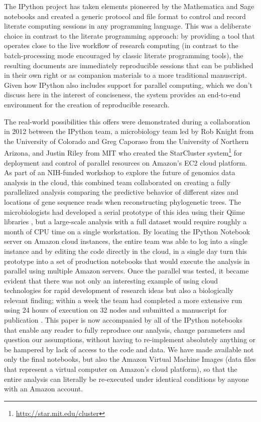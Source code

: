 \documentclass[ChapterTOCs,krantz2]{krantz} %
\begin{document}
The IPython project has taken elements pioneered by the Mathematica and Sage
notebooks and created a generic protocol and file format to control and record
literate computing sessions in any programming language.  This was a deliberate
choice in contrast to the literate programming approach: by providing a tool
that operates close to the live workflow of research computing (in contrast to
the batch-processing mode encouraged by classic literate programming tools),
the resulting documents are immediately reproducible sessions that can be
published in their own right or as companion materials to a more traditional
manuscript.  Given how IPython also includes support for parallel computing,
which we don't discuss here in the interest of conciseness, the system provides
an end-to-end environment for the creation of reproducible research.

The real-world possibilities this offers were demonstrated during a
collaboration in 2012 between the IPython team, a microbiology team led by Rob
Knight from the University of Colorado and Greg Caporaso from the University of
Northern Arizona, and Justin Riley from MIT who created the StarCluster system\footnote{\url{http://star.mit.edu/cluster}}
for deployment and control of
parallel resources on Amazon's EC2 cloud platform.  As part of an NIH-funded
workshop to explore the future of genomics data analysis in the cloud, this
combined team collaborated on creating a fully parallelized analysis comparing
the predictive behavior of different sizes and locations of gene sequence reads
when reconstructing phylogenetic trees.  The microbiologists had developed a
serial prototype of this idea using their Qiime libraries
\cite{caporaso2010qiime}, but a large-scale analysis with a full dataset would
require roughly a month of CPU time on a single workstation.  By locating the
IPython Notebook server on Amazon cloud instances, the entire team was able to
log into a single instance and by editing the code directly in the cloud, in a
single day turn this prototype into a set of production notebooks that would
execute the analysis in parallel using multiple Amazon servers.  Once the
parallel was tested, it became evident that there was not only an interesting
example of using cloud technologies for rapid development of research ideas but
also a biologically relevant finding; within a week the team had completed a
more extensive run using 24 hours of execution on 32 nodes and submitted a
manuscript for publication \cite{RWM+12}.  This paper is now accompanied by all
of the IPython notebooks that enable any reader to fully reproduce our
analysis, change parameters and question our assumptions, without having to
re-implement absolutely anything or be hampered by lack of access to the code
and data.  We have made available not only the final notebooks, but also the
Amazon Virtual Machine Images (data files that represent a virtual computer on
Amazon's cloud platform), so that the entire analysis can literally be
re-executed under identical conditions by anyone with an Amazon account.
\end{document}
